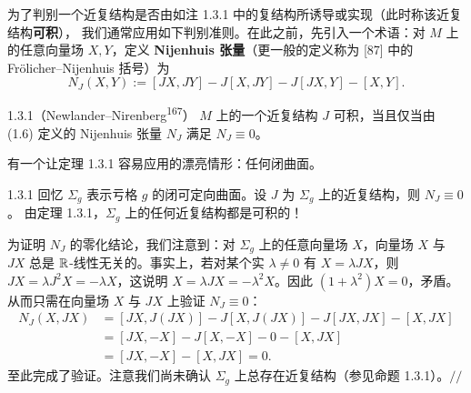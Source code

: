 为了判别一个近复结构是否由如注 1.3.1 中的复结构所诱导或实现（此时称该近复结构\textbf{可积}），
我们通常应用如下判别准则。在此之前，先引入一个术语：对 $M$ 上的任意向量场 $X,Y$，定义
\textbf{Nijenhuis 张量}（更一般的定义称为 [87] 中的 Frölicher--Nijenhuis 括号）为
\begin{equation}
  N_J(X,Y):=[JX,JY]-J[X,JY]-J[JX,Y]-[X,Y] .
  \tag{1.6}
\end{equation}

\begin{wthm}{1.3.1}（Newlander--Nirenberg\textsuperscript{167}）
$M$ 上的一个近复结构 $J$ 可积，当且仅当由 (1.6) 定义的 Nijenhuis 张量 $N_J$ 满足 $N_J\equiv0$。
\end{wthm}

有一个让定理 1.3.1 容易应用的漂亮情形：任何闭曲面。

\begin{wexam}{1.3.1}
回忆 $\Sigma_g$ 表示亏格 $g$ 的闭可定向曲面。设 $J$ 为 $\Sigma_g$ 上的近复结构，则 $N_J\equiv0$。
由定理 1.3.1，$\Sigma_g$ 上的任何近复结构都是可积的！

为证明 $N_J$ 的零化结论，我们注意到：对 $\Sigma_g$ 上的任意向量场 $X$，向量场 $X$ 与 $JX$
总是 $\mathbb{R}$-线性无关的。事实上，若对某个实 $\lambda\neq0$ 有 $X=\lambda JX$，则
$JX=\lambda J^2X=-\lambda X$，这说明 $X=\lambda JX=-\lambda^2X$。因此 $(1+\lambda^2)X=0$，矛盾。
从而只需在向量场 $X$ 与 $JX$ 上验证 $N_J\equiv0$：
\[
  \begin{aligned}
    N_J(X,JX)&=[JX,J(JX)]-J[X,J(JX)]-J[JX,JX]-[X,JX]\\
             &=[JX,-X]-J[X,-X]-0-[X,JX]\\
             &=[JX,-X]-[X,JX]=0 .
  \end{aligned}
\]
至此完成了验证。注意我们尚未确认 $\Sigma_g$ 上总存在近复结构（参见命题 1.3.1）。\hfill$//$
\end{wexam}

